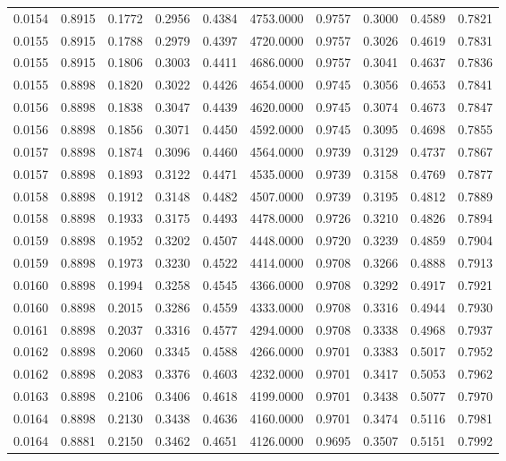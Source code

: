 \begin{tabular}{rrrrrrrrrr}
0.0154 & 0.8915 & 0.1772 & 0.2956 & 0.4384 & 4753.0000 & 0.9757 & 0.3000 & 0.4589 & 0.7821 \\
0.0155 & 0.8915 & 0.1788 & 0.2979 & 0.4397 & 4720.0000 & 0.9757 & 0.3026 & 0.4619 & 0.7831 \\
0.0155 & 0.8915 & 0.1806 & 0.3003 & 0.4411 & 4686.0000 & 0.9757 & 0.3041 & 0.4637 & 0.7836 \\
0.0155 & 0.8898 & 0.1820 & 0.3022 & 0.4426 & 4654.0000 & 0.9745 & 0.3056 & 0.4653 & 0.7841 \\
0.0156 & 0.8898 & 0.1838 & 0.3047 & 0.4439 & 4620.0000 & 0.9745 & 0.3074 & 0.4673 & 0.7847 \\
0.0156 & 0.8898 & 0.1856 & 0.3071 & 0.4450 & 4592.0000 & 0.9745 & 0.3095 & 0.4698 & 0.7855 \\
0.0157 & 0.8898 & 0.1874 & 0.3096 & 0.4460 & 4564.0000 & 0.9739 & 0.3129 & 0.4737 & 0.7867 \\
0.0157 & 0.8898 & 0.1893 & 0.3122 & 0.4471 & 4535.0000 & 0.9739 & 0.3158 & 0.4769 & 0.7877 \\
0.0158 & 0.8898 & 0.1912 & 0.3148 & 0.4482 & 4507.0000 & 0.9739 & 0.3195 & 0.4812 & 0.7889 \\
0.0158 & 0.8898 & 0.1933 & 0.3175 & 0.4493 & 4478.0000 & 0.9726 & 0.3210 & 0.4826 & 0.7894 \\
0.0159 & 0.8898 & 0.1952 & 0.3202 & 0.4507 & 4448.0000 & 0.9720 & 0.3239 & 0.4859 & 0.7904 \\
0.0159 & 0.8898 & 0.1973 & 0.3230 & 0.4522 & 4414.0000 & 0.9708 & 0.3266 & 0.4888 & 0.7913 \\
0.0160 & 0.8898 & 0.1994 & 0.3258 & 0.4545 & 4366.0000 & 0.9708 & 0.3292 & 0.4917 & 0.7921 \\
0.0160 & 0.8898 & 0.2015 & 0.3286 & 0.4559 & 4333.0000 & 0.9708 & 0.3316 & 0.4944 & 0.7930 \\
0.0161 & 0.8898 & 0.2037 & 0.3316 & 0.4577 & 4294.0000 & 0.9708 & 0.3338 & 0.4968 & 0.7937 \\
0.0162 & 0.8898 & 0.2060 & 0.3345 & 0.4588 & 4266.0000 & 0.9701 & 0.3383 & 0.5017 & 0.7952 \\
0.0162 & 0.8898 & 0.2083 & 0.3376 & 0.4603 & 4232.0000 & 0.9701 & 0.3417 & 0.5053 & 0.7962 \\
0.0163 & 0.8898 & 0.2106 & 0.3406 & 0.4618 & 4199.0000 & 0.9701 & 0.3438 & 0.5077 & 0.7970 \\
0.0164 & 0.8898 & 0.2130 & 0.3438 & 0.4636 & 4160.0000 & 0.9701 & 0.3474 & 0.5116 & 0.7981 \\
0.0164 & 0.8881 & 0.2150 & 0.3462 & 0.4651 & 4126.0000 & 0.9695 & 0.3507 & 0.5151 & 0.7992 \\

\end{tabular}
